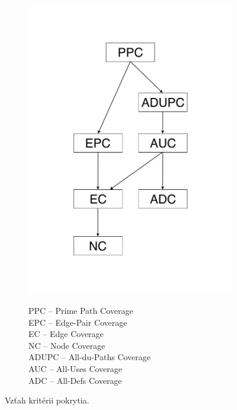 \begin{figure}[H]
	\begin{subfigure}{0.4\linewidth}
		\centering
		\includegraphics[width=\linewidth]{obrazky/vztah_kriterii.pdf}
	\end{subfigure}
	\quad
	\begin{subfigure}{0.4\linewidth}
		\centering
		\begin{flushleft}
			\large
			PPC -- Prime Path Coverage \\
			\medskip
			EPC -- Edge-Pair Coverage \\
			\medskip
			EC -- Edge Coverage \\
			\medskip
			NC -- Node Coverage \\
			\medskip
			ADUPC -- All-du-Paths Coverage \\
			\medskip
			AUC -- All-Uses Coverage \\
			\medskip
			ADC -- All-Defs Coverage \\
		\end{flushleft}
	\end{subfigure}
	\caption{Vzťah kritérii pokrytia.}
\end{figure}


